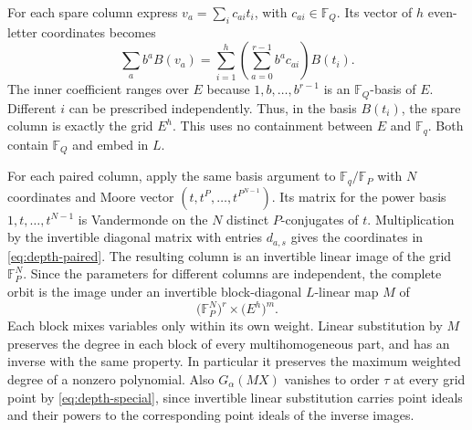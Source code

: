 \documentclass[11pt,letterpaper]{article}
\begin{document}
For each spare column express $v_a=\sum_i c_{ai}t_i$, with $c_{ai}\in\mathbb F_Q$. Its vector of $h$ even-letter coordinates becomes
\[
 \sum_a b^a B(v_a)
    =\sum_{i=1}^{h}\left(\sum_{a=0}^{r-1}b^a c_{ai}\right)B(t_i).
\]
The inner coefficient ranges over $E$ because $1,b,\ldots,b^{r-1}$ is an $\mathbb F_Q$-basis of $E$. Different $i$ can be prescribed independently. Thus, in the basis $B(t_i)$, the spare column is exactly the grid $E^h$. This uses no containment between $E$ and $\mathbb F_q$. Both contain $\mathbb F_Q$ and embed in $L$.

For each paired column, apply the same basis argument to $\mathbb F_q/\mathbb F_P$ with $N$ coordinates and Moore vector $(t,t^P,\ldots,t^{P^{N-1}})$. Its matrix for the power basis $1,t,\ldots,t^{N-1}$ is Vandermonde on the $N$ distinct $P$-conjugates of $t$. Multiplication by the invertible diagonal matrix with entries $d_{a,s}$ gives the coordinates in \eqref{eq:depth-paired}. The resulting column is an invertible linear image of the grid $\mathbb F_P^N$. Since the parameters for different columns are independent, the complete orbit is the image under an invertible block-diagonal $L$-linear map $M$ of
\[
 \bigl(\mathbb F_P^N\bigr)^r\times\bigl(E^{h}\bigr)^m.
\]
Each block mixes variables only within its own weight. Linear substitution by $M$ preserves the degree in each block of every multihomogeneous part, and has an inverse with the same property. In particular it preserves the maximum weighted degree of a nonzero polynomial. Also $G_\alpha(MX)$ vanishes to order $\tau$ at every grid point by \eqref{eq:depth-special}, since invertible linear substitution carries point ideals and their powers to the corresponding point ideals of the inverse images.
\end{document}
